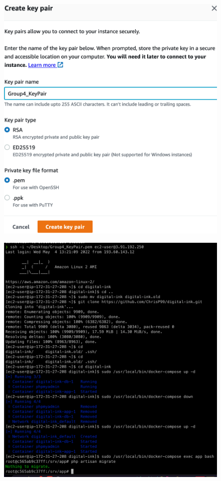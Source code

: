 \begin{figure}[!htbp]
    \centering
    \begin{minipage}{.5\textwidth}
        \centering
        \centering
        \includegraphics[width=1\linewidth]{resources/ec2/create-key-pair-2}
        \label{fig:create-keypair-pem}
    \end{minipage}%
    \begin{minipage}{.5\textwidth}
        \centering
        \includegraphics[width=1\linewidth]{resources/log-in-with-key-pair-2}

\end{minipage}
\end{figure}
